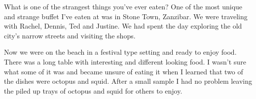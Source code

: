 What is one of the strangest things you've ever eaten?
One of the most unique and strange buffet I've eaten at was in Stone Town, Zanzibar.
We were traveling with Rachel, Dennis, Ted and Justine.
We had spent the day exploring the old city's narrow streets and visiting the shops.

Now we were on the beach in a festival type setting and ready to enjoy food.
There was a long table with interesting and different looking food.
I wasn't sure what some of it was and became unsure of eating it when I learned that two of the dishes were octopus and squid.
After a small sample I had no problem leaving the piled up trays of octopus and squid for others to enjoy.








